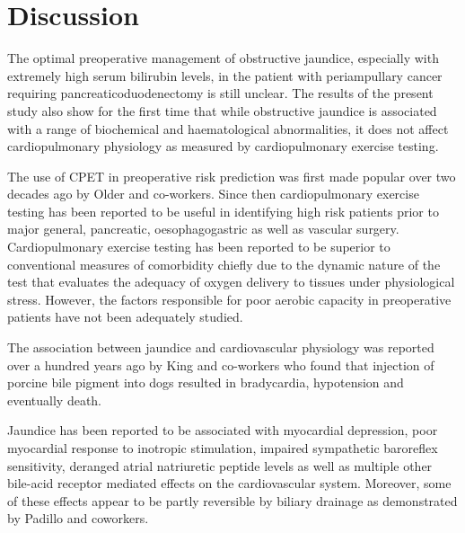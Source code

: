 \clearpage

\section{Discussion}
The optimal preoperative management of obstructive jaundice, especially with extremely high serum bilirubin levels, in the patient with periampullary cancer requiring pancreaticoduodenectomy is still unclear. The results of the present study also show for the first time that while obstructive jaundice is associated with a range of biochemical and haematological abnormalities, it does not affect cardiopulmonary physiology as measured by cardiopulmonary exercise testing. 

The use of CPET in preoperative risk prediction was first made popular over two decades ago by Older and co-workers.\parencite{older_preoperative_1993} Since then cardiopulmonary exercise testing has been reported to be useful in identifying high risk patients prior to major general\parencite{snowden_submaximal_2010}, pancreatic\parencite{chandrabalan_pre-operative_2013,ausania_effects_2012}, oesophagogastric\parencite{nagamatsu_preoperative_2001} as well as vascular\parencite{carlisle_mid-term_2007} surgery. Cardiopulmonary exercise testing has been reported to be superior to conventional measures of comorbidity chiefly due to the dynamic nature of the test that evaluates the adequacy of oxygen delivery to tissues under physiological stress. However, the factors responsible for poor aerobic capacity in preoperative patients have not been adequately studied.

The association between jaundice and cardiovascular physiology was reported over a hundred years ago by King and co-workers who found that injection of porcine bile pigment into dogs resulted in bradycardia, hypotension and eventually death.\parencite{king_effect_1909}

Jaundice has been reported to be associated with myocardial depression\parencite{green_jaundiced_1986}, poor myocardial response to inotropic stimulation\parencite{lumlertgul_jaundiced_1991}, impaired sympathetic baroreflex sensitivity\parencite{song_baroreflex_2009}, deranged atrial natriuretic peptide levels\parencite{pereira_increased_1994,gallardo_increased_1998} as well as multiple other bile-acid receptor mediated effects on the cardiovascular system.\parencite{khurana_bile_2011} Moreover, some of these effects appear to be partly reversible by biliary drainage as demonstrated by Padillo and coworkers.\parencite{padillo_improved_2001}

